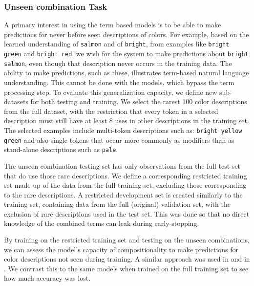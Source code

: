 \subsubsection{Unseen combination Task} \label{sec:extrapodata}
A primary interest in using the term based models is to be able to make predictions for never before seen descriptions of colors.
For example, based on the learned understanding of \texttt{salmon} and of \texttt{bright}, from examples like \texttt{bright green} and \texttt{bright red}, we wish for the system to make predictions about \texttt{bright salmon}, even though that description never occurs in the training data.
The ability to make predictions, such as these, illustrates term-based natural language understanding.
This cannot be done with the \empmodel{} models, which bypass the term processing step.
%
To evaluate this generalization capacity, we define new sub-datasets for both testing and training.
We select the rarest 100 color descriptions from the full dataset,
with the restriction that every token in a selected description must still have at least 8 uses in other descriptions in the training set.
The selected examples include multi-token descriptions such as: \texttt{bright yellow green} and also single tokens that occur more commonly as modifiers than as stand-alone descriptions such as \texttt{pale}.

The unseen combination testing set has only observations from the full test set that do use those rare descriptions.
We define a corresponding restricted training set made up of the data from the full training set, excluding those  corresponding to the rare descriptions.
A restricted development set is created similarly to the training set, containing data from the full (original) validation set, with the exclusion of rare descriptions used in the test set.
This was done so that no direct knowledge of the combined terms can leak during early-stopping.


By training on the restricted training set and testing on the unseen combinations, we can assess the model's capacity of compositionality to make predictions for color descriptions not seen during training.
A similar approach was used in \textcite{acl2018WinnLighter} and in \textcite{DBLP:journals/corr/AtzmonBKGC16}.
We contrast this to the same models when trained on the full training set to see how much accuracy was lost.

